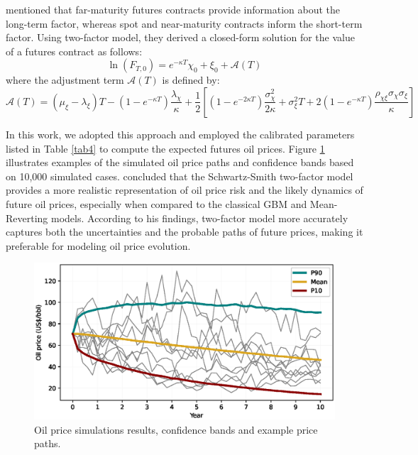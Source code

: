 \documentclass[pdflatex,sn-basic]{sn-jnl}%
\theoremstyle{thmstyleone}%
\theoremstyle{thmstyletwo}%
\theoremstyle{thmstylethree}%
\begin{document}
\cite{ref17} mentioned that far-maturity futures contracts provide information about the long-term factor, whereas spot and near-maturity contracts inform the short-term factor. Using two-factor model, they derived a closed-form solution for the value of a futures contract as follows:
\begin{equation}
    \ln(F_{T,0}) = e^{-\kappa T} \chi_0 + \xi_0 + \mathcal{A}(T)
\end{equation}
where the adjustment term $\mathcal{A}(T)$ is defined by:
\begin{equation}
    \mathcal{A}(T) = \left(\mu_{\xi} - \lambda_{\xi}\right) T - \left(1-e^{-\kappa T}\right) \frac{\lambda_{\chi}}{\kappa}
    + \frac{1}{2} \left[ \left(1 - e^{-2\kappa T}\right) \frac{\sigma_{\chi}^2}{2\kappa} + \sigma_{\xi}^2 T + 2 \left(1 - e^{-\kappa T}\right) \frac{\rho_{\chi\xi} \sigma_{\chi} \sigma_{\xi}}{\kappa} \right]
\end{equation}

In this work, we adopted this approach and employed the calibrated parameters listed in Table \ref{tab4} to compute the expected futures oil prices. Figure \ref{fig12} illustrates examples of the simulated oil price paths and confidence bands based on 10,000 simulated cases. \cite{ref21} concluded that the Schwartz-Smith two-factor model provides a more realistic representation of oil price risk and the likely dynamics of future oil prices, especially when compared to the classical GBM and Mean-Reverting models. According to his findings, two-factor model more accurately captures both the uncertainties and the probable paths of future prices, making it preferable for modeling oil price evolution.


 \begin{figure}[H]
\centering
\begin{minipage}{0.95\textwidth}
  \includegraphics[width=\textwidth]{Price_profile.eps}
  \caption{Oil price simulations results, confidence bands and example price paths.}
  \label{fig12}
\end{minipage}
\end{figure}
\end{document}
